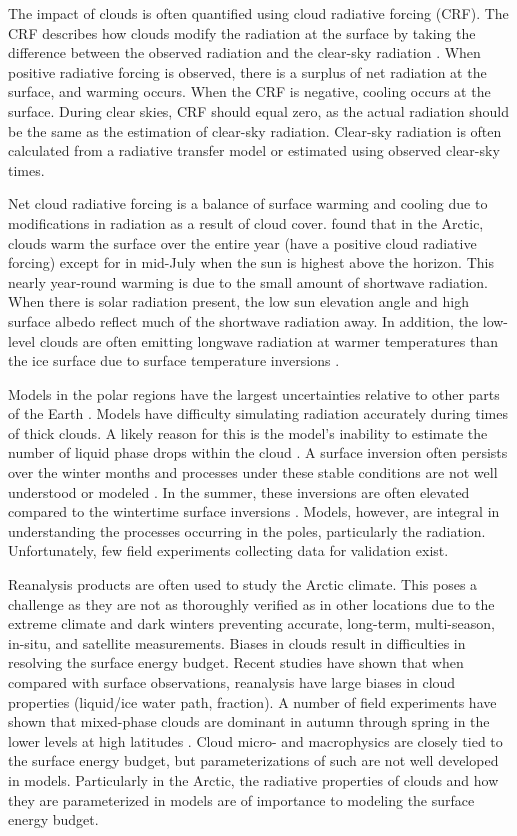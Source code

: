 The impact of clouds is often quantified using cloud radiative forcing (CRF). The CRF describes how clouds modify the radiation at the surface by taking the difference between the observed radiation and the clear-sky radiation \citep{ramanathan:1989}. When positive radiative forcing is observed, there is a surplus of net radiation at the surface, and warming occurs. When the CRF is negative, cooling occurs at the surface. During clear skies, CRF should equal zero, as the actual radiation should be the same as the estimation of clear-sky radiation. Clear-sky radiation is often calculated from a radiative transfer model or estimated using observed clear-sky times.

Net cloud radiative forcing is a balance of surface warming and cooling due to modifications in radiation as a result of cloud cover. \citet{curry:1992, intrieri:2002} found that in the Arctic, clouds warm the surface over the entire year (have a positive cloud radiative forcing) except for in mid-July when the sun is highest above the horizon. This nearly year-round warming is due to the small amount of shortwave radiation. When there is solar radiation present, the low sun elevation angle and high surface albedo reflect much of the shortwave radiation away. In addition, the low-level clouds are often emitting longwave radiation at warmer temperatures than the ice surface due to surface temperature inversions \citep{shupe:2003}.

Models in the polar regions have the largest uncertainties relative to other parts of the Earth \citep{holland:2003, AACI:05}. Models have difficulty simulating radiation accurately during times of thick clouds. A likely reason for this is the model’s inability to estimate the number of liquid phase drops within the cloud \citep{graham:2017}. A surface inversion often persists over the winter months and processes under these stable conditions are not well understood or modeled \citep{tastula:2012}. In the summer, these inversions are often elevated compared to the wintertime surface inversions \citep{serreze:1992}. Models, however, are integral in understanding the processes occurring in the poles, particularly the radiation.  Unfortunately, few field experiments collecting data for validation exist.

Reanalysis products are often used to study the Arctic climate. This poses a challenge as they are not as thoroughly verified as in other locations due to the extreme climate and dark winters preventing accurate, long-term, multi-season, in-situ, and satellite measurements. Biases in clouds result in difficulties in resolving the surface energy budget. Recent studies have shown that when compared with surface observations, reanalysis have large biases in cloud properties (liquid/ice water path, fraction). A number of field experiments have shown that mixed-phase clouds are dominant in autumn through spring in the lower levels at high latitudes \citep{intrieri:2002, wang:2005}. Cloud micro- and macrophysics are closely tied to the surface energy budget, but parameterizations of such are not well developed in models. Particularly in the Arctic, the radiative properties of clouds and how they are parameterized in models are of importance to modeling the surface energy budget. 


